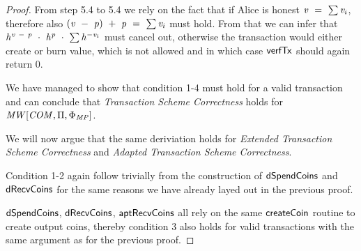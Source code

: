 \begin{proof}
    From step 5.4 to 5.4  we rely on the fact that if Alice is honest $\mathit{v} ~=~ \sum \mathit{v}_i$, therefore also $(\mathit{v} ~-~ \mathit{p}) ~+~\mathit{p} ~=~ \sum \mathit{v}_i$ must hold.
    From that we can infer that $\mathit{h}^{\mathit{v} ~-~ \mathit{p}} ~\cdot~ \mathit{h}^{\mathit{p}} ~\cdot~ \sum \mathit{h}^{- \mathit{v}_i}$ must cancel out, otherwise the transaction would either create or burn value, which is not allowed and in which case $\mathsf{verfTx}$ should again return 0.

    We have managed to show that condition 1-4 must hold for a valid transaction and can conclude that \emph{Transaction Scheme Correctness} holds for $\mathit{MW}[\mathit{COM},\Pi,\Phi_{\mathit{MP}}]$.

    We will now argue that the same deriviation holds for \emph{Extended Transaction Scheme Correctness} and \emph{Adapted Transaction Scheme Correctness}.

    Condition 1-2 again follow trivially from the construction of $\mathsf{dSpendCoins}$ and $\mathsf{dRecvCoins}$ for the same reasons we have already layed out in the previous proof.

    $\mathsf{dSpendCoins}$, $\mathsf{dRecvCoins}$, $\mathsf{aptRecvCoins}$ all rely on the same $\mathsf{createCoin}$ routine to create output coins, thereby condition 3  also holds for valid transactions with the same argument as for the previous proof.


\end{proof}
